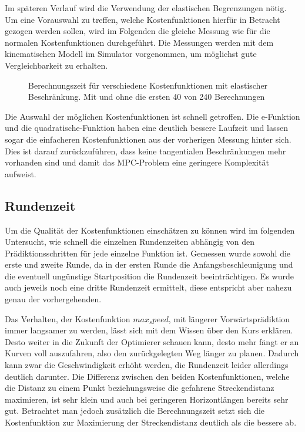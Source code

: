 \documentclass{like}
\begin{document}
Im späteren Verlauf wird die Verwendung der elastischen Begrenzungen nötig. Um eine Vorauswahl zu treffen, welche Kostenfunktionen hierfür in Betracht gezogen werden sollen, wird im Folgenden die gleiche Messung wie für die normalen Kostenfunktionen durchgeführt. Die Messungen werden mit dem kinematischen Modell im Simulator vorgenommen, um möglichst gute Vergleichbarkeit zu erhalten.

\begin{figure}
	\centering
	 
	\caption{Berechnungszeit für verschiedene Kostenfunktionen mit elastischer Beschränkung. Mit und ohne die ersten 40 von 240 Berechnungen}
	\label{fig:computeCostSoftConst}
\end{figure}

Die Auswahl der möglichen Kostenfunktionen ist schnell getroffen. Die e-Funktion und die quadratische-Funktion haben eine deutlich bessere Laufzeit und lassen sogar die einfacheren Kostenfunktionen aus der vorherigen Messung hinter sich. Dies ist darauf zurückzuführen, dass keine tangentialen Beschränkungen mehr vorhanden sind und damit das \ac{MPC}-Problem eine geringere Komplexität aufweist.


\subsection{Rundenzeit}
Um die Qualität der Kostenfunktionen einschätzen zu können wird im folgenden Untersucht, wie schnell die einzelnen Rundenzeiten abhängig von den Prädiktionsschritten für jede einzelne Funktion ist.
Gemessen wurde sowohl die erste und zweite Runde, da in der ersten Runde die Anfangsbeschleunigung und die eventuell ungünstige Startposition die Rundenzeit beeinträchtigen. Es wurde auch jeweils noch eine dritte Rundenzeit ermittelt, diese entspricht aber nahezu genau der vorhergehenden.

\begin{figure}
	\centering
	 
	\caption{}
	\label{fig:lapTimeKin}
\end{figure}

Das Verhalten, der Kostenfunktion $max_speed$, mit längerer Vorwärtsprädiktion immer langsamer zu werden, lässt sich mit dem Wissen über den Kurs erklären. Desto weiter in die Zukunft der Optimierer schauen kann, desto mehr fängt er an Kurven voll auszufahren, also den zurückgelegten Weg länger zu planen. Dadurch kann zwar die Geschwindigkeit erhöht werden, die Rundenzeit leider allerdings deutlich darunter. 
Die Differenz zwischen den beiden Kostenfunktionen, welche die Distanz zu einem Punkt beziehungsweise die gefahrene Streckendistanz maximieren, ist sehr klein und auch bei geringeren Horizontlängen bereits sehr gut. Betrachtet man jedoch zusätzlich die Berechnungszeit setzt sich die Kostenfunktion zur Maximierung der Streckendistanz deutlich als die bessere ab.
\end{document}
